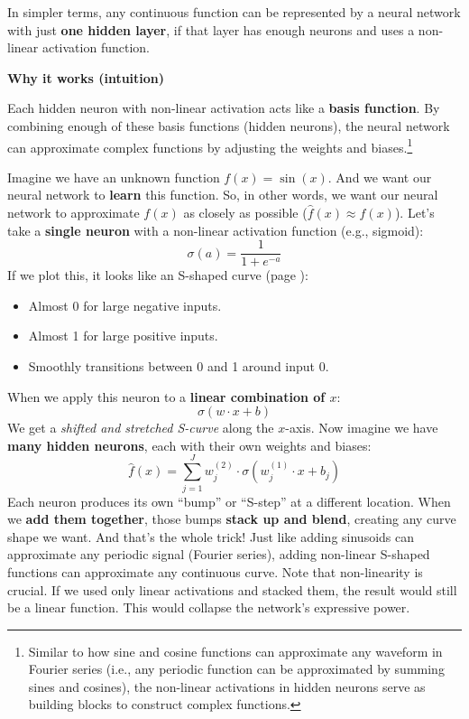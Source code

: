 \noindent
In simpler terms, any continuous function can be represented by a neural network with just \textbf{one hidden layer}, if that layer has enough neurons and uses a non-linear activation function.

\highspace
\begin{flushleft}
    \textcolor{Green3}{ \textbf{Why it works (intuition)}}
\end{flushleft}
Each hidden neuron with non-linear activation acts like a \textbf{basis function}. By combining enough of these basis functions (hidden neurons), the neural network can approximate complex functions by adjusting the weights and biases.\footnote{%
    Similar to how sine and cosine functions can approximate any waveform in Fourier series (i.e., any periodic function can be approximated by summing sines and cosines), the non-linear activations in hidden neurons serve as building blocks to construct complex functions.
}

\highspace
Imagine we have an unknown function $f(x) = \sin(x)$. And we want our neural network to \textbf{learn} this function. So, in other words, we want our neural network to approximate $f(x)$ as closely as possible ($\hat{f}(x) \approx f(x)$). Let's take a \textbf{single neuron} with a non-linear activation function (e.g., sigmoid):
\begin{equation*}
    \sigma(a) = \dfrac{1}{1 + e^{-a}}
\end{equation*}
If we plot this, it looks like an S-shaped curve (page \pageref{fig:sigmoid-activation-function}):
\begin{itemize}
    \item Almost 0 for large negative inputs.
    \item Almost 1 for large positive inputs.
    \item Smoothly transitions between 0 and 1 around input 0.
\end{itemize}
When we apply this neuron to a \textbf{linear combination of $x$}:
\begin{equation*}
    \sigma(w \cdot x + b)
\end{equation*}
We get a \emph{shifted and stretched S-curve} along the $x$-axis. Now imagine we have \textbf{many hidden neurons}, each with their own weights and biases:
\begin{equation*}
    \hat{f}(x) = \displaystyle\sum_{j=1}^{J} w_{j}^{(2)} \cdot \sigma(w_{j}^{(1)} \cdot x + b_{j})
\end{equation*}
Each neuron produces its own ``bump'' or ``S-step'' at a different location. When we \textbf{add them together}, those bumps \textbf{stack up and blend}, creating any curve shape we want. And that's the whole trick! Just like adding sinusoids can approximate any periodic signal (Fourier series), adding non-linear S-shaped functions can approximate any continuous curve. Note that non-linearity is crucial. If we used only linear activations and stacked them, the result would still be a linear function. This would collapse the network's expressive power.

